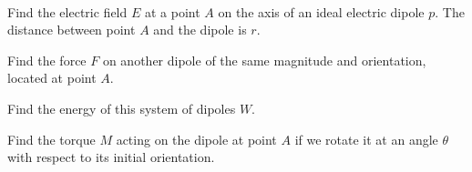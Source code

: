 \documentclass[../TST.tex]{subfiles}
\begin{document}
\begin{pproblem}{\ }
\begin{subpart}
\item Find the electric field $E$ at a point $A$ on the axis of an ideal electric dipole $p$. The distance between point $A$ and the dipole is $r$.
\item Find the force $F$ on another dipole of the same magnitude and orientation, located at point $A$.
\item Find the energy of this system of dipoles $W$. 
\item Find the torque $M$ acting on the dipole at point $A$ if we rotate it at an angle $\theta$ with respect to its initial orientation.\\
\end{subpart}
\end{pproblem}
\end{document}

